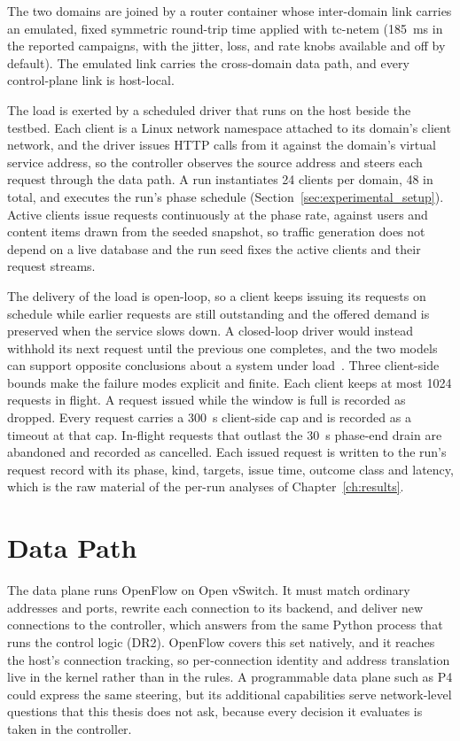 ﻿\documentclass[12pt,reqno,twoside]{amsbook}
\begin{document}
The two domains are joined by a router container whose inter-domain link
carries an emulated, fixed symmetric round-trip time applied with tc-netem
(185~ms in the reported campaigns, with the jitter, loss, and rate knobs
available and off by default). The emulated link carries the cross-domain
data path, and every control-plane link is host-local.

The load is exerted by a scheduled driver that runs on the host beside
the testbed. Each client is a Linux network namespace attached to its
domain's client network, and the driver issues HTTP calls from it against the
domain's virtual service address, so the controller observes the source
address and steers each request through the data path. A run instantiates 24
clients per domain, 48 in total, and executes the run's phase schedule
(Section~\ref{sec:experimental_setup}). Active clients issue requests
continuously at the phase rate, against users and content items drawn from the
seeded snapshot, so traffic generation does not depend on a live database and
the run seed fixes the active clients and their request streams.

The delivery of the load is open-loop, so a client keeps issuing its requests
on schedule while earlier requests are still outstanding and the offered
demand is preserved when the service slows down. A closed-loop driver would
instead withhold its next request until the previous one completes, and the two
models can support opposite conclusions about a system under
load~\parencite{Schroeder2006OpenVersusClosed}. Three client-side bounds make
the failure modes explicit and finite. Each client keeps at most 1024 requests
in flight. A request issued while the window is full is recorded as dropped.
Every request carries a 300~s client-side cap and is recorded as a timeout at
that cap. In-flight requests that outlast the 30~s phase-end drain are
abandoned and recorded as cancelled. Each issued request is written to the run's request
record with its phase, kind, targets, issue time, outcome class and latency,
which is the raw material of the per-run analyses of Chapter~\ref{ch:results}.

\section{Data Path}\label{sec:impl_data_path}

The data plane runs OpenFlow on Open vSwitch. It must match ordinary
addresses and ports,
rewrite each connection to its backend, and deliver new connections to
the controller, which answers from the same Python process that runs the
control logic (DR2). OpenFlow covers this set natively, and it reaches
the host's connection tracking, so per-connection identity and address
translation live in the kernel rather than in the rules. A programmable data
plane such as P4 could express the same steering, but its additional
capabilities serve network-level questions that this thesis does not ask,
because every decision it evaluates is taken in the controller.
\end{document}
